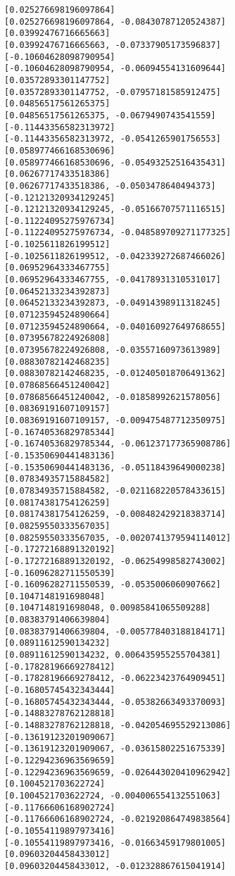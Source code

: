 \documentclass[11pt]{article}
\begin{document}
    \begin{Verbatim}[commandchars=\\\{\}]
[0.025276698196097864]
[0.025276698196097864, -0.08430787120524387]
[0.03992476716665663]
[0.03992476716665663, -0.07337905173596837]
[-0.10604628098790954]
[-0.10604628098790954, -0.06094554131609644]
[0.03572893301147752]
[0.03572893301147752, -0.07957181585912475]
[0.04856517561265375]
[0.04856517561265375, -0.0679490743541559]
[-0.11443356582313972]
[-0.11443356582313972, -0.0541265901756553]
[0.058977466168530696]
[0.058977466168530696, -0.05493252516435431]
[0.06267717433518386]
[0.06267717433518386, -0.0503478640494373]
[-0.12121320934129245]
[-0.12121320934129245, -0.05166707571116515]
[-0.11224095275976734]
[-0.11224095275976734, -0.048589709271177325]
[-0.1025611826199512]
[-0.1025611826199512, -0.042339272687466026]
[0.06952964333467755]
[0.06952964333467755, -0.04178931310531017]
[0.06452133234392873]
[0.06452133234392873, -0.04914398911318245]
[0.07123594524890664]
[0.07123594524890664, -0.040160927649768655]
[0.07395678224926808]
[0.07395678224926808, -0.03557160973613989]
[0.08830782142468235]
[0.08830782142468235, -0.012405018706491362]
[0.07868566451240042]
[0.07868566451240042, -0.01858992621578056]
[0.08369191607109157]
[0.08369191607109157, -0.009475487712350975]
[-0.16740536829785344]
[-0.16740536829785344, -0.061237177365908786]
[-0.15350690441483136]
[-0.15350690441483136, -0.05118439649000238]
[0.07834935715884582]
[0.07834935715884582, -0.021168220578433615]
[0.08174381754126259]
[0.08174381754126259, -0.008482429218383714]
[0.08259550333567035]
[0.08259550333567035, -0.0020741379594114012]
[-0.17272168891320192]
[-0.17272168891320192, -0.06254998582743002]
[-0.16096282711550539]
[-0.16096282711550539, -0.0535006060907662]
[0.1047148191698048]
[0.1047148191698048, 0.00985841065509288]
[0.08383791406639804]
[0.08383791406639804, -0.005778403188184171]
[0.08911612590134232]
[0.08911612590134232, 0.006435955255704381]
[-0.17828196669278412]
[-0.17828196669278412, -0.06223423764909451]
[-0.16805745432343444]
[-0.16805745432343444, -0.05382663493370093]
[-0.14883278762128818]
[-0.14883278762128818, -0.042054695529213086]
[-0.13619123201909067]
[-0.13619123201909067, -0.03615802251675339]
[-0.12294236963569659]
[-0.12294236963569659, -0.026443020410962942]
[0.1004521703622724]
[0.1004521703622724, -0.004006554132551063]
[-0.11766606168902724]
[-0.11766606168902724, -0.021920864749838564]
[-0.10554119897973416]
[-0.10554119897973416, -0.01663459179801005]
[0.09603204458433012]
[0.09603204458433012, -0.012328867615041914]

\end{Verbatim}
\end{document}
